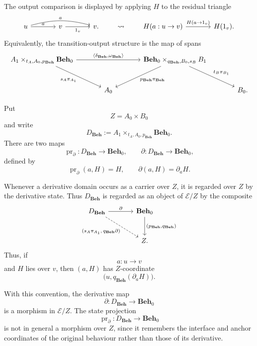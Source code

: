 The output comparison is displayed by applying \(H\) to the residual triangle
\[
\begin{tikzcd}[column sep=large, row sep=large]
    u
        \arrow[r, "a"]
        \arrow[rr, "a", bend left=15]
    &
    v
        \arrow[r, "1_v"']
    &
    v .
\end{tikzcd}
\qquad
\leadsto
\qquad
\begin{tikzcd}[column sep=large, row sep=large]
    H(a:u\to v)
        \arrow[r, "{H(a\to 1_v)}"]
    &
    H(1_v).
\end{tikzcd}
\]
Equivalently, the transition-output structure is the map of spans
\[
\begin{tikzcd}[column sep=large, row sep=large]
    A_1\times_{t_A,A_0,p_{\mathbf{Beh}}}\mathbf{Beh}_0
        \arrow[rr, "{\langle \delta_{\mathbf{Beh}},\omega_{\mathbf{Beh}}\rangle}"]
        \arrow[dr, "{s_A\pi_{A_1}}"']
    &&
    \mathbf{Beh}_0\times_{q_{\mathbf{Beh}},B_0,s_B}B_1
        \arrow[dl, "{p_{\mathbf{Beh}}\pi_{\mathbf{Beh}}}"]
        \arrow[dr, "{t_B\pi_{B_1}}"]
    \\
    &
    A_0
    &&
    B_0 .
\end{tikzcd}
\]

Put
\[
    Z=A_0\times B_0
\]
and write
\[
    D_{\mathbf{Beh}}
    :=
    A_1\times_{t_A,A_0,p_{\mathbf{Beh}}}\mathbf{Beh}_0.
\]
There are two maps
\[
    \operatorname{pr}_{\partial}:
    D_{\mathbf{Beh}}\to\mathbf{Beh}_0,
    \qquad
    \partial:
    D_{\mathbf{Beh}}\to\mathbf{Beh}_0,
\]
defined by
\[
    \operatorname{pr}_{\partial}(a,H)=H,
    \qquad
    \partial(a,H)=\partial_aH.
\]

Whenever a derivative domain occurs as a carrier over \(Z\), it is regarded
over \(Z\) by the derivative state. Thus \(D_{\mathbf{Beh}}\) is regarded as
an object of \(\mathcal E/Z\) by the composite
\[
\begin{tikzcd}[column sep=large, row sep=large]
    D_{\mathbf{Beh}}
        \arrow[r, "\partial"]
        \arrow[dr, dashed,
            "{(s_A\pi_{A_1},\,q_{\mathbf{Beh}}\partial)}"']
    &
    \mathbf{Beh}_0
        \arrow[d, "{(p_{\mathbf{Beh}},q_{\mathbf{Beh}})}"]
    \\
    &
    Z .
\end{tikzcd}
\]
Thus, if
\[
    a:u\to v
\]
and \(H\) lies over \(v\), then \((a,H)\) has \(Z\)-coordinate
\[
    \bigl(
        u,
        q_{\mathbf{Beh}}(\partial_aH)
    \bigr).
\]

With this convention, the derivative map
\[
    \partial:D_{\mathbf{Beh}}\to\mathbf{Beh}_0
\]
is a morphism in \(\mathcal E/Z\). The state projection
\[
    \operatorname{pr}_{\partial}:
    D_{\mathbf{Beh}}\to\mathbf{Beh}_0
\]
is not in general a morphism over \(Z\), since it remembers the interface and
anchor coordinates of the original behaviour rather than those of its
derivative.


